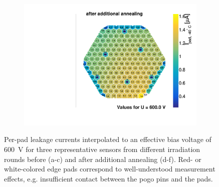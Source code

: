 \begin{figure}
\begin{subfigure}[b]{0.32\textwidth}
		\subcaption{
		}
		\label{plot:iv_hexplot_0541_04_annealed}
	\end{subfigure}
	\hfill	
	\begin{subfigure}[b]{0.32\textwidth}
		\includegraphics[width=0.999\textwidth]{plots/iv_hexplots/1013_annealed.pdf}
		\subcaption{
		}
		\label{plot:iv_hexplot_1013_annealed}
	\end{subfigure}    
	\caption{
		Per-pad leakage currents interpolated to an effective bias voltage of \SI{600}{\volt} for three representative sensors from different irradiation rounds before (a-c) and after additional annealing (d-f).
		Red- or white-colored edge pads correspond to well-understood measurement effects, e.g. insufficient contact between the pogo pins and the pads.
		}
	\label{plot:iv_hexplot}
\end{figure}


